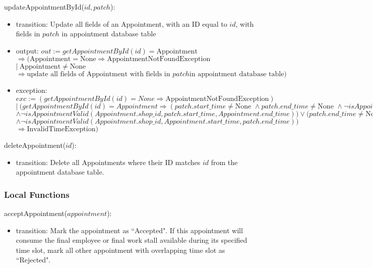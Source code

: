\documentclass[12pt, titlepage]{article}
\begin{document}
\noindent updateAppointmentById($id, patch$):
\begin{itemize}
	\item transition: Update all fields of an Appointment, with an ID equal to $id$, with fields in $patch$
	      in appointment database table
	\item output: $out := getAppointmentById(id) = \text{Appointment}$ \\ $\Rightarrow (\text{Appointment} =
		      \text{None} \Rightarrow \text{AppointmentNotFoundException }$ \\ $|\ \text{Appointment} \neq
		      \text{None}$ \\ $\Rightarrow \text{update all fields of Appointment with fields in } patch \text{
			      in appointment database table})$
	\item exception: $exc := (getAppointmentById(id) = None \Rightarrow \text{AppointmentNotFoundException})$
	      \\ $|\ (getAppointmentById(id) = Appointment \Rightarrow (patch.start\_time \neq \text{None } \land
		      patch.end\_time \neq \text{None } \land \neg isAppointmentValid(Appointment.shop\_id,
		      patch.start\_time, patch.end\_time)) \lor (patch.start\_time \neq \text{None}$ \\ $\land \neg
		      isAppointmentValid(Appointment.shop\_id, patch.start\_time, Appointment.end\_time)) \lor
		      (patch.end\_time \neq \text{None}$ \\ $\land \neg isAppointmentValid(Appointment.shop\_id,
		      Appointment.start\_time, patch.end\_time))$ \\ $\Rightarrow \text{InvalidTimeException})$
\end{itemize}

\noindent deleteAppointment($id$):
\begin{itemize}
	\item transition: Delete all Appointments where their ID matches $id$ from the appointment database
	      table.
\end{itemize}

\subsubsection{Local Functions}

\noindent acceptAppointment($appointment$):
\begin{itemize}
	\item transition: Mark the appointment as ``Accepted". If this appointment will consume the final
	      employee or final work stall available during its specified time slot, mark all other appointment
	      with overlapping time slot as ``Rejected".
\end{itemize}
\end{document}
